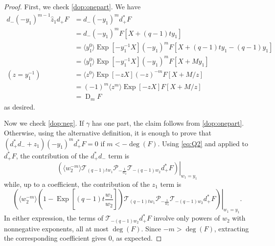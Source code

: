 \documentclass[reqno]{amsart}
\theoremstyle{plain}
\theoremstyle{definition}
\theoremstyle{remark}
\DeclareMathOperator{\D}{D}
\DeclareMathOperator{\Exp}{Exp}
\newcommand{\z}{\widehat{z}}
\newcommand{\<}{\langle}
\renewcommand{\>}{\rangle}
\begin{document}
\begin{proof}
    First, we check \eqref{dop:onepart}. We have
    \begin{align*}
        d_- (-y_1)^{m-1} \z_1 d_+ F & = d_- (-y_1)^m d_+^* F \\
        & = d_- (-y_1)^m F[X + (q-1)ty_1] \\
        & = \langle y_1^0 \rangle \Exp[-y_1^{-1} X] (-y_1)^m F[X + (q-1)ty_1 - (q-1)y_1] \\
        & = \langle y_1^0 \rangle \Exp[-y_1^{-1} X] (-y_1)^m F[X + M y_1] \\
        (z = y_1^{-1}) & = \langle z^0 \rangle \Exp[-zX] (-z)^{-m} F[X + M/z] \\
        & = (-1)^m \langle z^m \rangle \Exp[-zX] F[X + M/z] \\
        & = \D_{m} F
    \end{align*}
    as desired.

    Now we check \eqref{dop:neg}. If $\gamma$ has one part, the claim follows from \eqref{dop:onepart}. Otherwise, using the alternative definition, it is enough to prove that $(d_+^* d_- + z_1) (-y_1)^m d_+^* F = 0$ if $m < - \deg(F)$.
    Using \eqref{eq:Q2} and  applied to $d_+^* F$, the contribution of the $d_+^* d_-$ term is
    \[ 
        \left. \left(\langle w_2^{-m} \rangle \mathcal{T}_{(q-1)t w_1} \mathcal{P}_{-\frac{1}{w_2}} \mathcal{T}_{-(q-1)w_2} d_+^* F \right) \right\rvert_{w_1=y_1}
    \]
    while, up to a coefficient, the contribution of the $z_1$ term is
    \[ 
        \left. \left(\langle w_2^{-m} \rangle \left(1-\Exp\left[(q-1)t\frac{w_1}{w_2}\right] \right) \mathcal{T}_{(q-1)tw_1}\mathcal{P}_{-\frac{1}{w_2}} \mathcal{T}_{-(q-1)w_2} d_+^* F \right) \right\rvert_{w_1=y_1}.
    \]
    In either expression, the terms of $\mathcal{T}_{-(q-1)w_2} d_+^* F$ involve only powers of $w_2$ with nonnegative exponents, all at most $\deg(F)$. Since $-m > \deg(F)$, extracting the corresponding coefficient gives $0$, as expected.


\end{proof}
\end{document}

